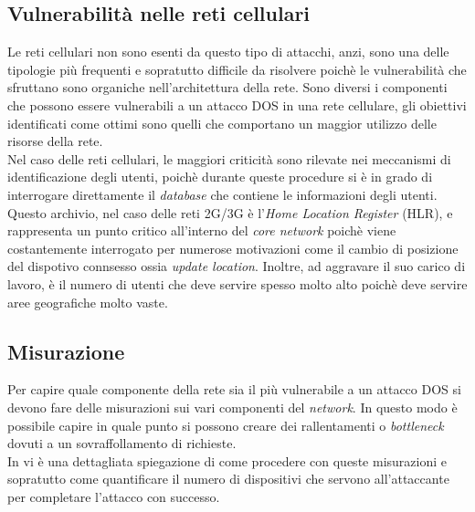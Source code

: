 \subsection{Vulnerabilità nelle reti cellulari}
Le reti cellulari non sono esenti da questo tipo di attacchi, anzi, sono una delle tipologie più frequenti e sopratutto difficile da risolvere
poichè le vulnerabilità che sfruttano sono organiche nell'architettura della rete.
Sono diversi i componenti che possono essere vulnerabili a un attacco DOS in una rete cellulare, gli obiettivi identificati come ottimi sono quelli
che comportano un maggior utilizzo delle risorse della rete.\\
Nel caso delle reti cellulari, le maggiori criticità sono rilevate nei meccanismi di identificazione degli utenti, poichè durante queste procedure si
è in grado di interrogare direttamente il \textit{database} che contiene le informazioni degli utenti.
Questo archivio, nel caso delle reti 2G/3G è l'\textit{Home Location Register} (HLR), e rappresenta un punto critico all'interno del \textit{core network}
poichè viene costantemente interrogato per numerose motivazioni come il cambio di posizione del dispotivo connsesso ossia \textit{update location}.
Inoltre, ad aggravare il suo carico di lavoro, è il numero di utenti che deve servire spesso molto alto poichè deve servire aree geografiche molto vaste.

\subsection{Misurazione}
Per capire quale componente della rete sia il più vulnerabile a un attacco DOS si devono fare delle misurazioni sui vari componenti del \textit{network}.
In questo modo è possibile capire in quale punto si possono creare dei rallentamenti o \textit{bottleneck} dovuti a un sovraffollamento di richieste.\\
In \cite{measuring-dos} vi è una dettagliata spiegazione di come procedere con queste misurazioni e sopratutto come quantificare il numero di dispositivi che 
servono all'attaccante per completare l'attacco con successo.